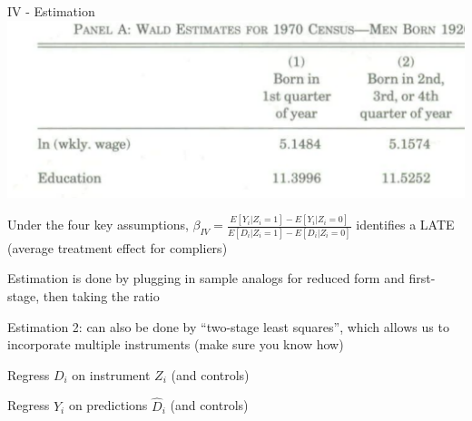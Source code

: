 \documentclass[11pt,english,handout]{beamer}
\newenvironment{wideitemize}{\itemize\addtolength{\itemsep}{10pt}}{\enditemize}
\begin{document}
\begin{frame}{IV - Estimation}
		\includegraphics[width = 0.5\linewidth]{../Chapter7/ak-first-stage-basic}

	\begin{wideitemize}
		\item
		Under the four key assumptions, $\beta_{IV} = \frac{ E[Y_i | Z_i = 1] - E[Y_i | Z_i = 0] }{E[D_i | Z_i = 1] - E[D_i | Z_i = 0]}$ identifies a LATE (average treatment effect for compliers) 
		
		\item
		Estimation is done by plugging in sample analogs for reduced form and first-stage, then taking the ratio
		
		\pause
		\item
		Estimation 2: can also be done by ``two-stage least squares'', which allows us to incorporate multiple instruments (make sure you know how) 
			\begin{wideitemize}
				\item
				Regress $D_i$ on instrument $Z_i$ (and controls)
				
				\item
				Regress $Y_i$ on predictions $\hat{D}_i$ (and controls)
			\end{wideitemize}
	\end{wideitemize}
	
\end{frame}
\end{document}
